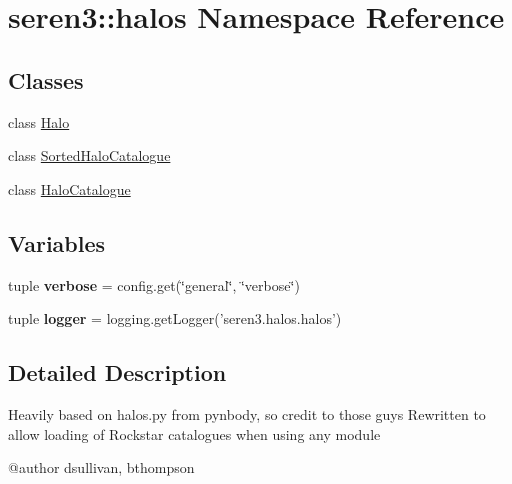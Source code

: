\hypertarget{namespaceseren3_1_1halos}{
\section{seren3::halos Namespace Reference}
\label{namespaceseren3_1_1halos}
}
\subsection*{Classes}
\begin{DoxyCompactItemize}
\item 
class \hyperlink{classseren3_1_1halos_1_1Halo}{Halo}
\item 
class \hyperlink{classseren3_1_1halos_1_1SortedHaloCatalogue}{SortedHaloCatalogue}
\item 
class \hyperlink{classseren3_1_1halos_1_1HaloCatalogue}{HaloCatalogue}
\end{DoxyCompactItemize}
\subsection*{Variables}
\begin{DoxyCompactItemize}
\item 
\hypertarget{namespaceseren3_1_1halos_ab72701eafd43452727ab8b597b1acd44}{
tuple {\bfseries verbose} = config.get(\char`\"{}general\char`\"{}, \char`\"{}verbose\char`\"{})}
\label{namespaceseren3_1_1halos_ab72701eafd43452727ab8b597b1acd44}

\item 
\hypertarget{namespaceseren3_1_1halos_acf938d5fa3929ad80caf63be1aa8eb52}{
tuple {\bfseries logger} = logging.getLogger('seren3.halos.halos')}
\label{namespaceseren3_1_1halos_acf938d5fa3929ad80caf63be1aa8eb52}

\end{DoxyCompactItemize}


\subsection{Detailed Description}
\begin{DoxyVerb}
Heavily based on halos.py from pynbody, so credit to those guys
Rewritten to allow loading of Rockstar catalogues when using any module

@author dsullivan, bthompson
\end{DoxyVerb}
 
